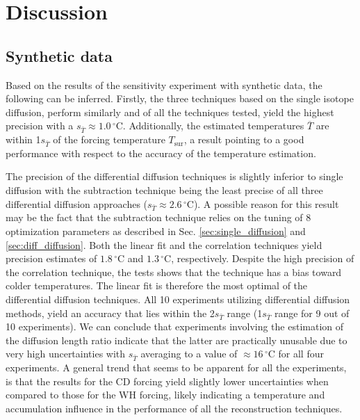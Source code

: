 \documentclass[11pt, draftcls, onecolumn]{IEEEtran} %
\numberwithin{equation}{section}
\numberwithin{table}{section}
\numberwithin{figure}{section}
\begin{document}

\section{Discussion}\label{sec:discussion}

\subsection{Synthetic data}\label{sec:discussion_synthetic}
Based on the results of the sensitivity experiment with 
synthetic data, the following can be inferred. Firstly, the three techniques based on the 
single isotope diffusion, perform similarly and of all the techniques
tested, yield the highest precision with a $s_{\bar{T}} \approx 1.0 \,{}^{\circ} \text{C}$.
Additionally, the estimated temperatures $\overline{T}$ are within 1$s_{\bar{T}}$
of the forcing temperature  $T_{\text{sur}}$, a result pointing to a good performance with respect to 
the accuracy of the temperature estimation. 

The precision of the differential diffusion techniques is slightly
inferior to single diffusion with the subtraction 
technique being the least precise of all three differential diffusion approaches ($s_{\bar{T}} \approx 2.6 \,{}^{\circ} \text{C}$). 
A possible reason for this result may be the fact that the subtraction technique relies on the 
tuning of 8 optimization parameters as described in Sec. \ref{sec:single_diffusion} and 
\ref{sec:diff_diffusion}.
Both the linear fit and the correlation techniques yield precision estimates of $1.8 \,{}^{\circ} \text{C}$ and 
 $1.3 \,{}^{\circ} \text{C}$, respectively.
Despite the high precision of the correlation technique, the tests shows that the technique has a bias toward colder temperatures. 
The linear fit is therefore the most optimal of the differential diffusion techniques.
All 10 experiments utilizing differential diffusion methods, yield an accuracy that lies within the 2$s_{\bar{T}}$ range
(1$s_{\bar{T}}$ range for 9 out of 10 experiments). We can conclude that experiments involving the estimation 
of the diffusion length ratio indicate that the latter are practically unusable due to very high uncertainties
with $s_{\bar{T}}$ averaging to a value of  $\approx 16 \,{}^{\circ} \text{C}$ for all four experiments.
A general trend that seems to be apparent for all the experiments, is that the results for the CD forcing yield
slightly lower uncertainties when compared to those for the WH forcing, likely indicating a
temperature and accumulation influence in the performance of all the reconstruction techniques. 
\end{document}
